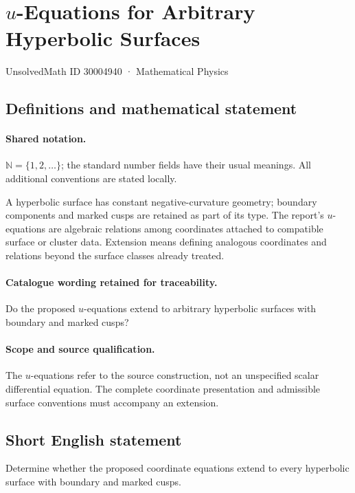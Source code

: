 \documentclass[11pt]{article}
\begin{document}
\setcounter{section}{30004939}
\section{$u$-Equations for Arbitrary Hyperbolic Surfaces}\label{30004940}
{\small UnsolvedMath ID 30004940 · Mathematical Physics}
\subsection{Definitions and mathematical statement}

\paragraph{Shared notation.}$\mathbb N=\{1,2,\ldots\}$; the standard number fields have their usual meanings. All additional conventions are stated locally.


A hyperbolic surface has constant negative-curvature geometry; boundary components and marked cusps are retained as part of its type. The report's $u$-equations are algebraic relations among coordinates attached to compatible surface or cluster data. Extension means defining analogous coordinates and relations beyond the surface classes already treated.

\paragraph{Catalogue wording retained for traceability.}
Do the proposed $u$-equations extend to arbitrary hyperbolic surfaces with boundary and marked cusps?

\paragraph{Scope and source qualification.}The $u$-equations refer to the source construction, not an unspecified scalar differential equation. The complete coordinate presentation and admissible surface conventions must accompany an extension.
\subsection{Short English statement}
Determine whether the proposed coordinate equations extend to every hyperbolic surface with boundary and marked cusps.
\end{document}
